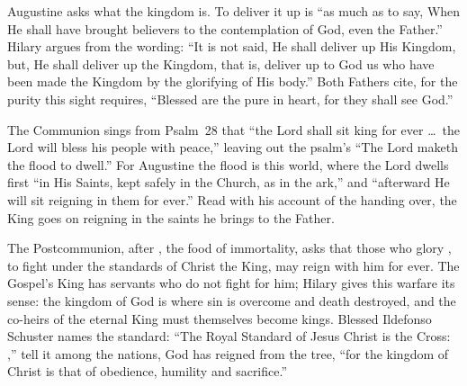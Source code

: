 Augustine asks what the kingdom is. To deliver it up is ``as much as to say,
When He shall have brought believers to the contemplation of God, even the
Father.'' Hilary argues from the wording: ``It is not said, He shall deliver
up His Kingdom, but, He shall deliver up the Kingdom, that is, deliver up to
God us who have been made the Kingdom by the glorifying of His body.'' Both
Fathers cite, for the purity this sight requires, ``Blessed are the pure in
heart, for they shall see God.''

The Communion sings from Psalm~28 that ``the Lord shall sit king for ever
\dots\ the Lord will bless his people with peace,'' leaving out the psalm's ``The Lord maketh
the flood to dwell.'' For Augustine the flood is this world, where the Lord dwells first ``in
His Saints, kept safely in the Church, as in the ark,'' and ``afterward He
will sit reigning in them for ever.'' Read with his account of the handing
over, the King goes on reigning in the saints he brings to the Father.

The Postcommunion, after , the food of
immortality, asks that those who glory , to fight under the standards of Christ the King, may reign with him
for ever. The Gospel's King has servants who do not fight for him; Hilary gives
this warfare its sense: the kingdom of God
is where sin is overcome and death destroyed, and the co-heirs of the eternal
King must themselves become kings. Blessed Ildefonso Schuster names the
standard: ``The Royal Standard of Jesus Christ is the Cross: ,'' tell it among the nations, God has
reigned from the tree, ``for the kingdom of Christ is that of obedience,
humility and sacrifice.''
